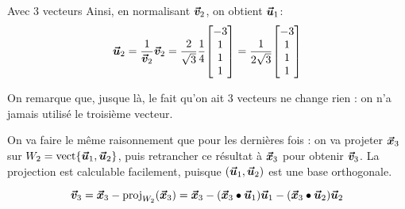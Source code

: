 \documentclass[a4paper]{article}
\begin{document}
\begin{parag}{Avec 3 vecteurs}
    Ainsi, en normalisant $\bm{\protect\vec{v}}_2$, on obtient $\bm{\protect\vec{u}}_1$: 
    \[\bvec{u}_2 = \frac{1}{\bvec{v}_2} \bvec{v}_2 = \frac{2}{\sqrt{3}} \frac{1}{4} \begin{bmatrix} -3 \\ 1 \\ 1 \\ 1 \end{bmatrix} = \frac{1}{2\sqrt{3}} \begin{bmatrix} -3 \\ 1 \\ 1 \\ 1 \end{bmatrix} \]

    On remarque que, jusque là, le fait qu'on ait 3 vecteurs ne change rien : on n'a jamais utilisé le troisième vecteur.


    On va faire le même raisonnement que pour les dernières fois : on va projeter $\bm{\protect\vec{x}}_3$ sur $W_2 = \vect\left\{\bvec{u}_1, \bvec{u}_2\right\}$, puis retrancher ce résultat à $\bm{\protect\vec{x}}_3$ pour obtenir $\bm{\protect\vec{v}}_3$. La projection est calculable facilement, puisque $\left(\bvec{u}_1, \bvec{u}_2\right)$ est une base orthogonale.
    
    \[\bvec{v}_3 = \bvec{x}_3 - \proj_{W_2}\left(\bvec{x}_3\right) = \bvec{x}_3 - \left(\bvec{x}_3 \dotprod \bvec{u}_1\right)\bvec{u}_1 - \left(\bvec{x}_3 \dotprod \bvec{u}_2\right)\bvec{u}_2\]


\end{parag}
\end{document}

